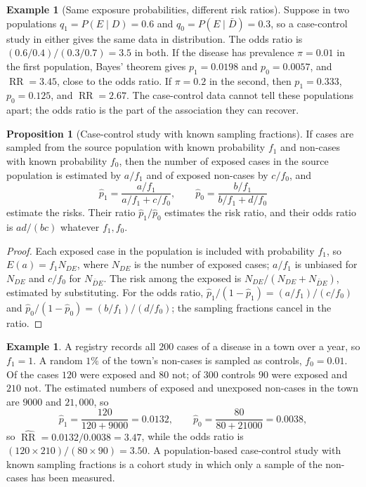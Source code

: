\documentclass[11pt,a4paper]{article}
\numberwithin{equation}{section}
\DeclareMathOperator{\RR}{RR}
\theoremstyle{definition}
\newtheorem{exa}[thm]{Example}
\newtheorem{prop}[thm]{Proposition}
\begin{document}
\begin{exa}[Same exposure probabilities, different risk ratios]
Suppose in two populations $q_1 = P(E \mid D) = 0.6$ and $q_0 = P(E \mid \bar D) = 0.3$, so a case-control study in either gives the same
data in distribution. The odds ratio is $(0.6/0.4)/(0.3/0.7) = 3.5$ in both. If the disease has prevalence $\pi = 0.01$ in the first
population, Bayes' theorem gives $p_1 = 0.0198$ and $p_0 = 0.0057$, and $\RR = 3.45$, close to the odds ratio. If $\pi = 0.2$ in the
second, then $p_1 = 0.333$, $p_0 = 0.125$, and $\RR = 2.67$. The case-control data cannot tell these populations apart; the odds ratio is the
part of the association they can recover.
\end{exa}

\begin{prop}[Case-control study with known sampling fractions]
\label{prop:fractions}
If cases are sampled from the source population with known probability $f_1$ and non-cases with known probability $f_0$, then the
number of exposed cases in the source population is estimated by $a/f_1$ and of exposed non-cases by $c/f_0$, and
\[
\hat p_1 = \frac{a/f_1}{a/f_1 + c/f_0}, \qquad \hat p_0 = \frac{b/f_1}{b/f_1 + d/f_0}
\]
estimate the risks. Their ratio $\hat p_1/\hat p_0$ estimates the risk ratio, and their odds ratio is $ad/(bc)$ whatever $f_1, f_0$.
\end{prop}

\begin{proof}
Each exposed case in the population is included with probability $f_1$, so $E(a) = f_1 N_{DE}$, where $N_{DE}$ is the number of exposed cases;
$a/f_1$ is unbiased for $N_{DE}$ and $c/f_0$ for $N_{\bar D E}$. The risk among the exposed is $N_{DE}/(N_{DE} + N_{\bar D E})$, estimated by substituting.
For the odds ratio, $\hat p_1/(1 - \hat p_1) = (a/f_1)/(c/f_0)$ and $\hat p_0/(1 - \hat p_0) = (b/f_1)/(d/f_0)$; the sampling fractions cancel in the ratio.
\end{proof}

\begin{exa}
A registry records all $200$ cases of a disease in a town over a year, so $f_1 = 1$. A random $1\%$ of the town's non-cases is sampled as
controls, $f_0 = 0.01$. Of the cases $120$ were exposed and $80$ not; of $300$ controls $90$ were exposed and $210$ not. The estimated numbers
of exposed and unexposed non-cases in the town are $9000$ and $21{,}000$, so
\[
\hat p_1 = \frac{120}{120 + 9000} = 0.0132, \qquad \hat p_0 = \frac{80}{80 + 21000} = 0.0038,
\]
so $\widehat{\RR} = 0.0132/0.0038 = 3.47$,
while the odds ratio is $(120 \times 210)/(80 \times 90) = 3.50$. A population-based case-control study with known sampling fractions is
a cohort study in which only a sample of the non-cases has been measured.
\end{exa}
\end{document}
